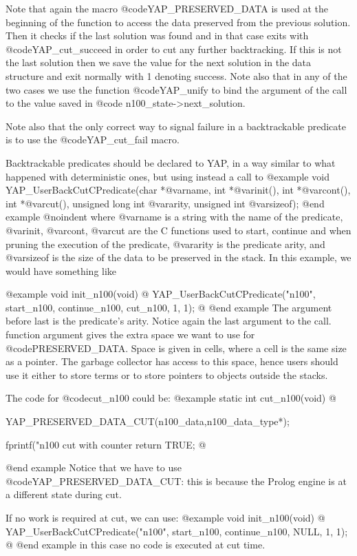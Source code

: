 {{{{{{{{Note that again the macro @code{YAP_PRESERVED_DATA} is used at the
beginning of the function to access the data preserved from the previous
solution.  Then it checks if the last solution was found and in that
case exits with @code{YAP_cut_succeed} in order to cut any further
backtracking.  If this is not the last solution then we save the value
for the next solution in the data structure and exit normally with 1
denoting success. Note also that in any of the two cases we use the
function @code{YAP_unify} to bind the argument of the call to the value
saved in @code{ n100_state->next_solution}.


Note also that the only correct way to signal failure in a backtrackable
predicate is to use the @code{YAP_cut_fail} macro.

Backtrackable predicates should be declared to YAP, in a way
similar to what happened with deterministic ones, but using instead a
call to
@example
      void YAP_UserBackCutCPredicate(char *@var{name},
                 int *@var{init}(), int *@var{cont}(), int *@var{cut}(),
                 unsigned long int @var{arity}, unsigned int @var{sizeof});
@end example
@noindent
where @var{name} is a string with the name of the predicate, @var{init},
@var{cont}, @var{cut} are the C functions used to start, continue and
when pruning the execution of the predicate, @var{arity} is the
predicate arity, and @var{sizeof} is the size of the data to be
preserved in the stack. In this example, we would have something like

@example
void
init_n100(void)
@{
  YAP_UserBackCutCPredicate("n100", start_n100, continue_n100, cut_n100, 1, 1);
@}
@end example
The argument before last is the predicate's arity. Notice again the
last argument to the call. function argument gives the extra space we
want to use for @code{PRESERVED_DATA}. Space is given in cells, where
a cell is the same size as a pointer. The garbage collector has access
to this space, hence users should use it either to store terms or to
store pointers to objects outside the stacks.

The code for @code{cut_n100} could be:
@example
static int cut_n100(void)
@{
  YAP_PRESERVED_DATA_CUT(n100_data,n100_data_type*);

  fprintf("n100 cut with counter %
  return TRUE;
@}
@end example
Notice that we have to use @code{YAP_PRESERVED_DATA_CUT}: this is
because the Prolog engine is at a different state during cut.

If no work is required at cut, we can use:
@example
void
init_n100(void)
@{
  YAP_UserBackCutCPredicate("n100", start_n100, continue_n100, NULL, 1, 1);
@}
@end example
in this case no code is executed at cut time.

}}}}}}}}
